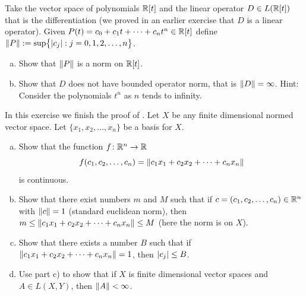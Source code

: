 \pagebreak[1]
\begin{exercise}
Take the vector space of polynomials ${\mathbb{R}}[t]$ and the linear operator $D \in
L({\mathbb{R}}[t])$ that is
the differentiation (we proved in an earlier exercise that $D$ is a linear
operator).  Given $P(t) = c_0 + c_1 t + \cdots + c_n
t^n \in {\mathbb{R}}[t]$ define $\lVert {P} \rVert := \sup \bigl\{ \lvert {c_j} \rvert : j = 0,1,2,\ldots,n \bigr\}$.
\begin{enumerate}[a)]
\item
Show that $\lVert {P} \rVert$ is a norm on ${\mathbb{R}}[t]$.
\item
Show that $D$ does not have bounded operator norm, that is $\lVert {D} \rVert =
\infty$.  Hint: Consider the polynomials $t^n$ as $n$ tends to infinity.
\end{enumerate}
\end{exercise}

\pagebreak[1]
\begin{exercise}
In this exercise we finish the proof of .
Let $X$ be any finite dimensional normed vector space.
Let $\{ x_1,x_2,\ldots,x_n \}$ be a basis for $X$.
\begin{enumerate}[a)]
\item
Show that the function $f \colon {\mathbb{R}}^n \to {\mathbb{R}}$
\begin{equation*}
f(c_1,c_2,\ldots,c_n) = 
\lVert {c_1 x_1 + c_2 x_2 + \cdots + c_n x_n} \rVert
\end{equation*}
is continuous.
\item
Show that there exist numbers $m$ and $M$ such
that if $c = (c_1,c_2,\ldots,c_n) \in {\mathbb{R}}^n$ with
$\lVert {c} \rVert = 1$ (standard euclidean norm), then 
$m \leq \lVert {c_1 x_1 + c_2 x_2 + \cdots + c_n x_n} \rVert \leq M$ (here the
norm is on $X$).
\item
Show that there exists a number $B$ such that if
$\lVert {c_1 x_1 + c_2 x_2 + \cdots + c_n x_n} \rVert=1$,
then $\lvert {c_j} \rvert \leq B$.
\item
Use part c) to show that if $X$ is finite dimensional vector 
spaces and $A \in L(X,Y)$, then $\lVert {A} \rVert < \infty$.
\end{enumerate}
\end{exercise}

